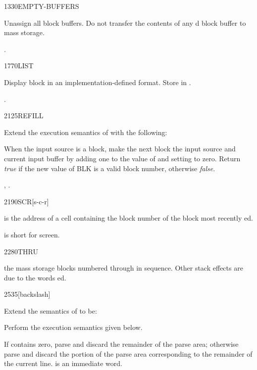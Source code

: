 \begin{worddef}{1330}{EMPTY-BUFFERS}
\item \stack{}{}

	Unassign all block buffers. Do not transfer the contents of
	any d block buffer to mass storage.

\see {}.
\end{worddef}


\begin{worddef}{1770}{LIST}
\item {}

	Display block  in an implementation-defined format.
	Store  in .

\see {}.
\end{worddef}


\begin{worddef}{2125}{REFILL}
\item {}

	Extend the execution semantics of 
	with the following:

	When the input source is a block, make the next block the input
	source and current input buffer by adding one to the value of
	 and setting  to zero. Return
	\emph{true} if the new value of BLK is a valid block number,
	otherwise \emph{false}.

\see {},
	.
\end{worddef}


\begin{worddef}{2190}{SCR}[s-c-r]
\item {}

	 is the address of a cell containing the block
	number of the block most recently ed.

	\begin{rationale} %
		 is short for screen.
	\end{rationale}
\end{worddef}


\begin{worddef}{2280}{THRU}
\item {}

	 the mass storage blocks numbered  through
	 in sequence. Other stack effects are due to the words
	ed.
\end{worddef}


\begin{worddef}[bs]{2535}{\bs}[backslash]
\item Extend the semantics of  to be:

\compile
	Perform the execution semantics given below.

\execute

	If  contains zero, parse and discard the remainder
	of the parse area; otherwise parse and discard the portion
	of the parse area corresponding to the remainder of the current
	line.  is an immediate word.
\end{worddef}
